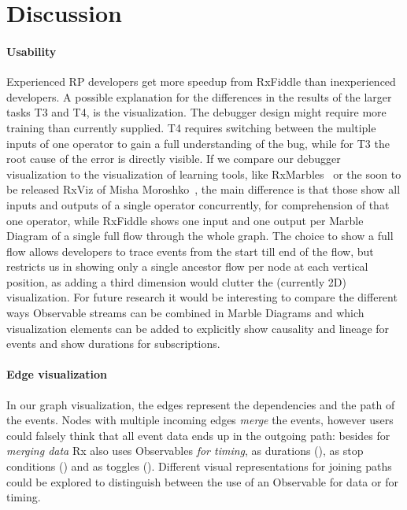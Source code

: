 \section{Discussion}

\paragraph{Usability}
Experienced RP developers get more speedup from RxFiddle than inexperienced developers. A possible explanation for the differences in the results of the larger tasks T3 and T4, is the visualization. The debugger design might require more training than currently supplied. T4 requires switching between the multiple inputs of one operator to gain a full understanding of the bug, while for T3 the root cause of the error is directly visible. If we compare our debugger visualization to the visualization of learning tools, like RxMarbles~\cite{rxmarbles} or the soon to be released RxViz of Misha Moroshko~\cite{rxviz}, the main difference is that those show all inputs and outputs of a single operator concurrently, for comprehension of that one operator, while RxFiddle shows one input and one output per Marble Diagram of a single full flow through the whole graph. The choice to show a full flow allows developers to trace events from the start till end of the flow, but restricts us in showing only a single ancestor flow per node at each vertical position, as adding a third dimension would clutter the (currently 2D) visualization. For future research it would be interesting to compare the different ways Observable streams can be combined in Marble Diagrams and which visualization elements can be added to explicitly show causality and lineage for events and show durations for subscriptions.

\paragraph{Edge visualization}
In our graph visualization, the edges represent the dependencies and the path of the events. Nodes with multiple incoming edges \emph{merge} the events, however users could falsely think that all event data ends up in the outgoing path: besides for \textit{merging data} Rx also uses Observables \textit{for timing}, as durations (), as stop conditions () and as toggles (). Different visual representations for joining paths could be explored to distinguish between the use of an Observable for data or for timing.
